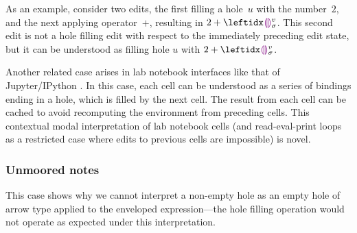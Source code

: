 As an example, consider two edits, the first filling a hole~$u$ with
the number~$2$, and the next applying operator~$+$, resulting in $2
+ \dehole{v}{\sigma}{}$.
%
This second edit is not a hole filling edit with respect to the
immediately preceding edit state, but it can be understood as filling
hole $u$ with $2 + \dehole{v}{\sigma}{}$. 



Another related case arises in lab notebook interfaces like that of
Jupyter/IPython \cite{PER-GRA:2007}.
%
In this case, each cell can be understood as a series of 
bindings ending in a hole, which is filled by the next cell.
%
The result from each cell can be cached to avoid recomputing the
environment from preceding cells. This contextual modal interpretation
of lab notebook cells (and read-eval-print loops as a restricted case
where edits to previous cells are impossible) is novel.

\subsubsection{Unmoored notes}


This case shows why we cannot interpret a non-empty hole as an empty
hole of arrow type applied to the enveloped expression---the hole
filling operation would not operate as expected under this
interpretation.
